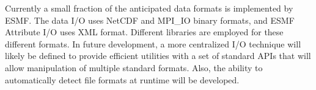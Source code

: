
Currently a small fraction of the anticipated data formats is implemented by 
ESMF.  The data I/O uses NetCDF and MPI\_IO binary formats, and ESMF Attribute
I/O uses XML format.  Different libraries are employed for these
different formats.  In future development, a more centralized I/O technique
will likely be defined to provide efficient utilities with a set of standard
APIs that will allow manipulation of multiple standard formats.  Also, the 
ability to automatically detect file formats at runtime will be developed.
